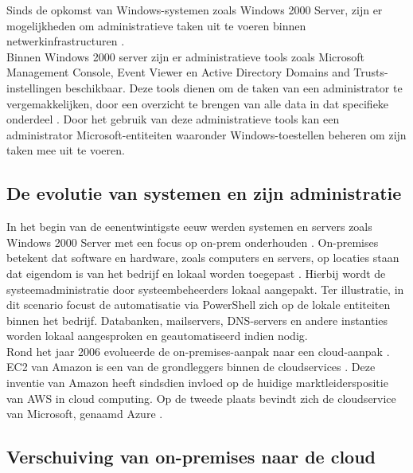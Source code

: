 
Sinds de opkomst van Windows-systemen zoals Windows 2000 Server, zijn er mogelijkheden om administratieve taken uit te voeren binnen netwerkinfrastructuren \autocite{Tulloch2001}. \\

Binnen Windows 2000 server zijn er administratieve tools zoals Microsoft Management Console, Event Viewer en Active Directory Domains and Trusts-instellingen beschikbaar. Deze tools dienen om de taken van een administrator te vergemakkelijken, door een overzicht te brengen van alle data in dat specifieke onderdeel \autocite{Sibisi2022}. Door het gebruik van deze administratieve tools kan een administrator Microsoft-entiteiten waaronder Windows-toestellen beheren om zijn taken mee uit te voeren. 

\subsection{De evolutie van systemen en zijn administratie}


In het begin van de eenentwintigste eeuw werden systemen en servers zoals Windows 2000 Server met een focus op \ac{on-prem} onderhouden \autocite{Microsoft2022a}. On-premises betekent dat software en hardware, zoals computers en servers, op locaties staan dat eigendom is van het bedrijf en lokaal worden toegepast \autocite{Gastermann2015}. Hierbij wordt de systeemadministratie door systeembeheerders lokaal aangepakt. Ter illustratie, in dit scenario focust de automatisatie via PowerShell zich op de lokale entiteiten binnen het bedrijf. Databanken, mailservers, \ac{DNS}-servers en andere instanties worden lokaal aangesproken en geautomatiseerd indien nodig. \\

Rond het jaar 2006 evolueerde de on-premises-aanpak naar een cloud-aanpak \autocite{Hayes2008}. \ac{EC2} van Amazon is een van de grondleggers binnen de cloudservices \autocite{Qian2009}. Deze inventie van Amazon heeft sindsdien invloed op de huidige marktleiderspositie van AWS in cloud computing. Op de tweede plaats bevindt zich de cloudservice van Microsoft, genaamd Azure \autocite{Vailshery2022}.



\subsection{Verschuiving van on-premises naar de cloud}

